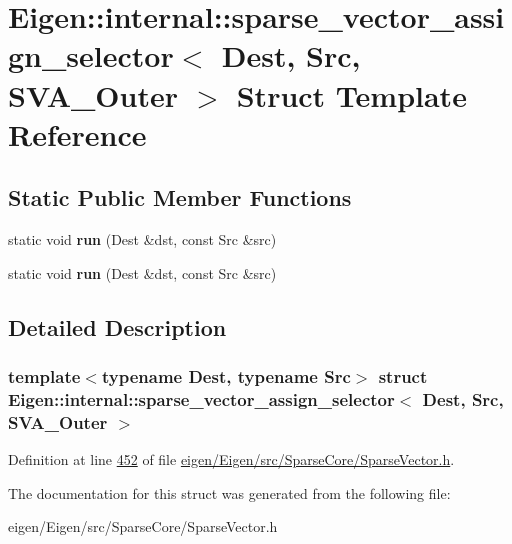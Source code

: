 \hypertarget{struct_eigen_1_1internal_1_1sparse__vector__assign__selector_3_01_dest_00_01_src_00_01_s_v_a___outer_01_4}{}\section{Eigen\+:\+:internal\+:\+:sparse\+\_\+vector\+\_\+assign\+\_\+selector$<$ Dest, Src, S\+V\+A\+\_\+\+Outer $>$ Struct Template Reference}
\label{struct_eigen_1_1internal_1_1sparse__vector__assign__selector_3_01_dest_00_01_src_00_01_s_v_a___outer_01_4}
\subsection*{Static Public Member Functions}
\begin{DoxyCompactItemize}
\item 
\mbox{\label{struct_eigen_1_1internal_1_1sparse__vector__assign__selector_3_01_dest_00_01_src_00_01_s_v_a___outer_01_4_ab645fb8871541297330c452a57c1c9fc}} 
static void {\bfseries run} (Dest \&dst, const Src \&src)
\item 
\mbox{\label{struct_eigen_1_1internal_1_1sparse__vector__assign__selector_3_01_dest_00_01_src_00_01_s_v_a___outer_01_4_ab645fb8871541297330c452a57c1c9fc}} 
static void {\bfseries run} (Dest \&dst, const Src \&src)
\end{DoxyCompactItemize}


\subsection{Detailed Description}
\subsubsection*{template$<$typename Dest, typename Src$>$\newline
struct Eigen\+::internal\+::sparse\+\_\+vector\+\_\+assign\+\_\+selector$<$ Dest, Src, S\+V\+A\+\_\+\+Outer $>$}



Definition at line \hyperlink{eigen_2_eigen_2src_2_sparse_core_2_sparse_vector_8h_source_l00452}{452} of file \hyperlink{eigen_2_eigen_2src_2_sparse_core_2_sparse_vector_8h_source}{eigen/\+Eigen/src/\+Sparse\+Core/\+Sparse\+Vector.\+h}.



The documentation for this struct was generated from the following file\+:\begin{DoxyCompactItemize}
\item 
eigen/\+Eigen/src/\+Sparse\+Core/\+Sparse\+Vector.\+h\end{DoxyCompactItemize}
